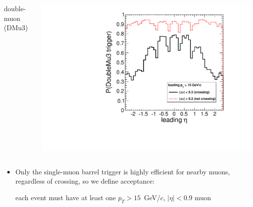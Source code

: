 \documentclass[compress]{beamer}
\begin{document}
\begin{frame}
\begin{columns}
\centering double-muon (DMu3)

\includegraphics[width=\linewidth]{eta_mass5cut_triggerDoubleMu3.pdf}
\end{columns}

\begin{itemize}
\item Only the single-muon barrel trigger is highly efficient for
  nearby muons, regardless of crossing, so we define acceptance:

each event must have at least one $p_T > 15$~GeV/$c$, $|\eta| < 0.9$ muon
\end{itemize}
\end{frame}
\end{document}
